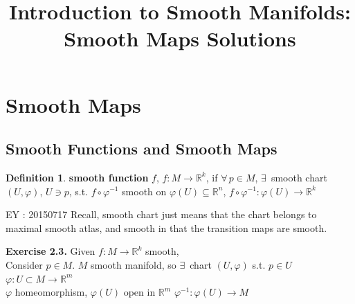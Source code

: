 \documentclass[11pt]{amsart}
\title{Introduction to Smooth Manifolds: Smooth Maps Solutions}
\theoremstyle{definition}
\newtheorem{definition}{Definition}
\newcommand{\exercisehead}[1]{\medskip\noindent\textbf{Exercise #1.} }
\begin{document}
\maketitle
\section{Smooth Maps}


\subsection*{Smooth Functions and Smooth Maps}

\begin{definition}
 \textbf{smooth function } $f$, $f:M \to \mathbb{R}^k$, if $\forall \, p \in M$,  $\exists \, $ smooth chart $(U,\varphi)$, $U \ni p$, s.t. $f\circ \varphi^{-1}$ smooth on $\varphi(U) \subseteq \mathbb{R}^n$, $f\circ \varphi^{-1}: \varphi(U) \to \mathbb{R}^k$
\end{definition}
EY : 20150717 Recall, smooth chart just means that the chart belongs to maximal smooth atlas, and smooth in that the transition maps are smooth.





\exercisehead{2.3} Given $f: M \to \mathbb{R}^k$ smooth, \\
Consider $p \in M$.  $M$ smooth manifold, so $\exists \, $ chart $(U,\varphi)$ s.t. $p \in U$ \\
$\varphi : U \subset M \to \mathbb{R}^m$ \\
$\varphi$ homeomorphism, $\varphi(U)$ open in $\mathbb{R}^m$
$\varphi^{-1}: \varphi(U) \to M$
\end{document}
